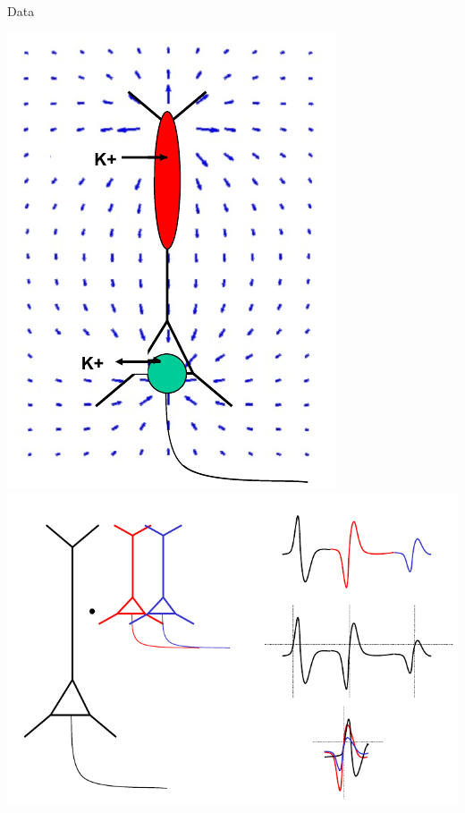 \documentclass[10pt]{beamer}
\begin{document}
\begin{frame}[allowframebreaks]{Data}
\begin{center}
  \includegraphics[keepaspectratio,width=0.35\framewidth]{img/2_lfp.png}
  \includegraphics[keepaspectratio,width=0.64\framewidth]{img/2_lfp_mur.png}
 \end{center}
 \framebreak
 \begin{center}

\end{center}
\end{frame}
\end{document}
